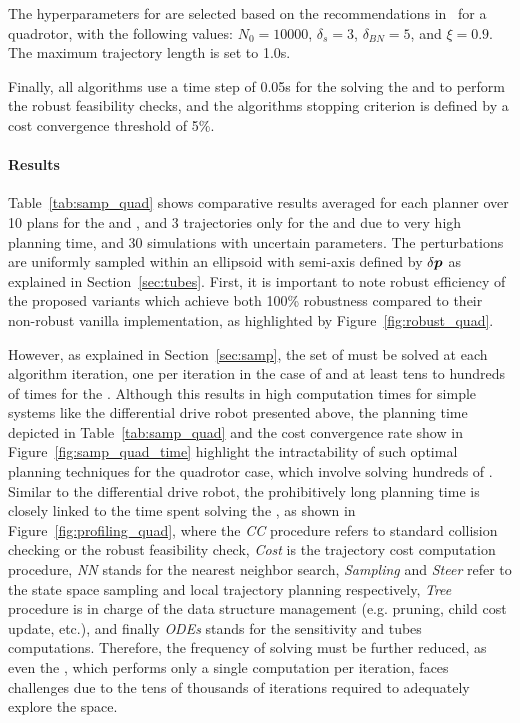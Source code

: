The hyperparameters for  are selected based on the recommendations in~\cite{cSST} for a quadrotor, with the following values: $N_0 = 10000$, $\delta_s = 3$, $\delta_{BN} = 5$, and $\xi = 0.9$.
The maximum trajectory length is set to 1.0s.

Finally, all algorithms use a time step of 0.05s for the solving the  and to perform the robust feasibility checks, and the algorithms stopping criterion is defined by a cost convergence threshold of 5\%.

\paragraph{Results}



Table~\ref{tab:samp_quad} shows comparative results averaged for each planner over 10 plans for the  and , and 3 trajectories only for the  and  due to very high planning time, and 30 simulations with uncertain parameters. 
The perturbations are uniformly sampled within an ellipsoid with semi-axis defined by $\delta \boldsymbol{p}$ as explained in Section~\ref{sec:tubes}.
First, it is important to note robust efficiency of the proposed  variants which achieve both 100\% robustness compared to their non-robust vanilla implementation, as highlighted by Figure~\ref{fig:robust_quad}.

However, as explained in Section~\ref{sec:samp}, the set of  must be solved at each algorithm iteration, one per iteration in the case of  and at least tens to hundreds of times for the .
Although this results in high computation times for simple systems like the differential drive robot presented above, the planning time depicted in Table~\ref{tab:samp_quad} and the cost convergence rate show in Figure~\ref{fig:samp_quad_time} highlight the intractability of such optimal planning techniques for the quadrotor case, which involve solving hundreds of .
Similar to the differential drive robot, the prohibitively long planning time is closely linked to the time spent solving the , as shown in Figure~\ref{fig:profiling_quad}, where the \emph{CC} procedure refers to standard collision checking or the robust feasibility check, \emph{Cost} is the trajectory cost computation procedure, \emph{NN} stands for the nearest neighbor search, \emph{Sampling} and \emph{Steer} refer to the state space sampling and local trajectory planning respectively, \emph{Tree} procedure is in charge of the data structure management (e.g. pruning, child cost update, etc.), and finally \emph{ODEs} stands for the sensitivity and tubes computations.
Therefore, the frequency of  solving must be further reduced, as even the , which performs only a single computation per iteration, faces challenges due to the tens of thousands of iterations required to adequately explore the space.

